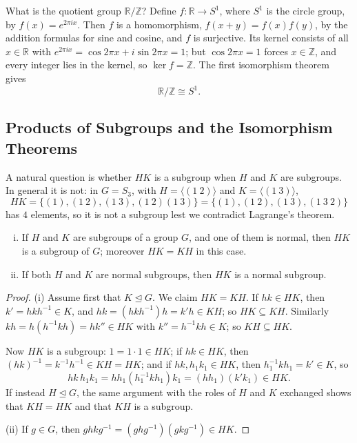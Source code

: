 \begin{eg}\label{eg:R-mod-Z}
	What is the quotient group \(\mathbb R/\mathbb Z\)? Define
	\(f\colon \mathbb R \to S^1\), where \(S^1\) is the circle group, by
	\(f(x) = e^{2\pi ix}\). Then \(f\) is a homomorphism, \(f(x+y) = f(x)f(y)\), by the
	addition formulas for sine and cosine, and \(f\) is surjective. Its kernel consists of
	all \(x \in \mathbb R\) with \(e^{2\pi ix} = \cos 2\pi x + i\sin 2\pi x = 1\); but
	\(\cos 2\pi x = 1\) forces \(x \in \mathbb Z\), and every integer lies in the kernel, so
	\(\ker f = \mathbb Z\). The first isomorphism theorem gives
	\[
		\mathbb R/\mathbb Z \cong S^1.
	\]
\end{eg}

\subsection{Products of Subgroups and the Isomorphism Theorems}

A natural question is whether \(HK\) is a subgroup when \(H\) and \(K\) are subgroups. In
general it is not: in \(G = S_3\), with \(H = \langle(1\ 2)\rangle\) and
\(K = \langle(1\ 3)\rangle\),
\[
	HK = \{(1), (1\ 2), (1\ 3), (1\ 2)(1\ 3)\} = \{(1), (1\ 2), (1\ 3), (1\ 3\ 2)\}
\]
has \(4\) elements, so it is not a subgroup lest we contradict Lagrange's theorem.

\begin{proposition}\label{prop:HK-subgroup}
	\begin{enumerate}[(i)]
		\item If \(H\) and \(K\) are subgroups of a group \(G\), and one of them is normal,
		      then \(HK\) is a subgroup of \(G\); moreover \(HK = KH\) in this case.
		\item If both \(H\) and \(K\) are normal subgroups, then \(HK\) is a normal subgroup.
	\end{enumerate}
\end{proposition}

\begin{proof}
	(i) Assume first that \(K \trianglelefteq G\). We claim \(HK = KH\). If \(hk \in HK\), then
	\(k' = hkh^{-1} \in K\), and \(hk = (hkh^{-1})h = k'h \in KH\); so \(HK \subseteq KH\).
	Similarly \(kh = h(h^{-1}kh) = hk'' \in HK\) with \(k'' = h^{-1}kh \in K\); so
	\(KH \subseteq HK\).

	Now \(HK\) is a subgroup: \(1 = 1 \cdot 1 \in HK\); if \(hk \in HK\), then
	\((hk)^{-1} = k^{-1}h^{-1} \in KH = HK\); and if \(hk, h_1k_1 \in HK\), then
	\(h_1^{-1}kh_1 = k' \in K\), so
	\[
		hk\,h_1k_1 = hh_1(h_1^{-1}kh_1)k_1 = (hh_1)(k'k_1) \in HK.
	\]
	If instead \(H \trianglelefteq G\), the same argument with the roles of \(H\) and \(K\)
	exchanged shows that \(KH = HK\) and that \(KH\) is a subgroup.

	(ii) If \(g \in G\), then \(ghkg^{-1} = (ghg^{-1})(gkg^{-1}) \in HK\).
\end{proof}

